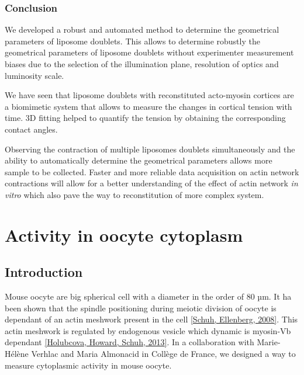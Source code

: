 \documentclass[A4paperpaper,11pt,english]{sphinxmanual}
\begin{document}
\subsection{Conclusion}
\label{parts/part4:id25}
We developed a robust and automated method to determine the geometrical
parameters of liposome doublets. This allows to determine robustly the
geometrical parameters of liposome doublets without
experimenter measurement biases due to the selection of the illumination plane,
resolution of optics and luminosity scale.

We have seen that liposome doublets with reconstituted acto-myosin cortices are
a biomimetic system that allows to measure the changes in cortical tension with
time. 3D fitting helped to quantify the tension by obtaining the corresponding contact angles.

Observing the contraction of multiple liposomes doublets simultaneously and the
ability to automatically determine the geometrical parameters allows more
sample to be collected. Faster and more reliable data acquisition on actin
network contractions will allow for a better understanding of the effect of actin
network \emph{in vitro} which also pave the way to reconstitution of more complex system.


\chapter{Activity in oocyte cytoplasm}
\label{parts/part5::doc}\label{parts/part5:activity-in-oocyte-cytoplasm}

\section{Introduction}
\label{parts/part5:introduction}
Mouse oocyte are big spherical cell with a diameter in the order of 80 µm.  It
ha been shown that the spindle positioning during meiotic division of oocyte is
dependant of an actin meshwork present in the cell {\hyperref[parts/part5:schuh2008]{{[}Schuh, Ellenberg,  2008{]}}}.  This
actin meshwork is regulated by endogenous vesicle which dynamic is myosin-Vb
dependant {\hyperref[parts/part5:holubcova2013]{{[}Holubcova, Howard, Schuh,  2013{]}}}. In a collaboration with Marie-Hélène Verhlac
and Maria Almonacid in Collège de France, we designed a way to  measure
cytoplasmic activity in mouse oocyte.
\end{document}
